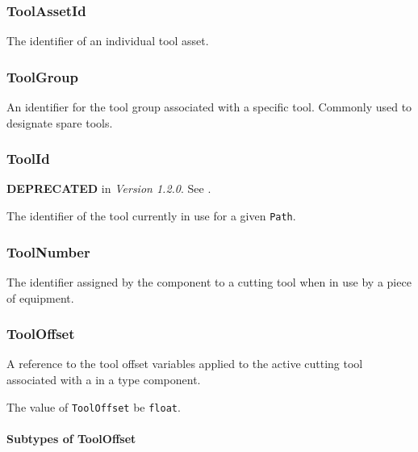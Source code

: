 \subsubsection{ToolAssetId}
\label{sec:ToolAssetId}



The identifier of an individual tool asset.



\subsubsection{ToolGroup}
\label{sec:ToolGroup}



An identifier for the tool group associated with a specific tool. Commonly used to designate spare tools.



\subsubsection{ToolId}
\label{sec:ToolId}



\textbf{DEPRECATED} in \textit{Version 1.2.0}.   See .

The identifier of the tool currently in use for a given \texttt{Path}.



\subsubsection{ToolNumber}
\label{sec:ToolNumber}



The identifier assigned by the  component to a cutting tool when in use by a piece of equipment. 



\subsubsection{ToolOffset}
\label{sec:ToolOffset}



A reference to the tool offset variables applied to the active cutting tool associated with a  in a  type component.


The value of \texttt{ToolOffset} \MUST be \texttt{float}.


\paragraph{Subtypes of ToolOffset}\mbox{}
\label{sec:Subtypes of ToolOffset}

